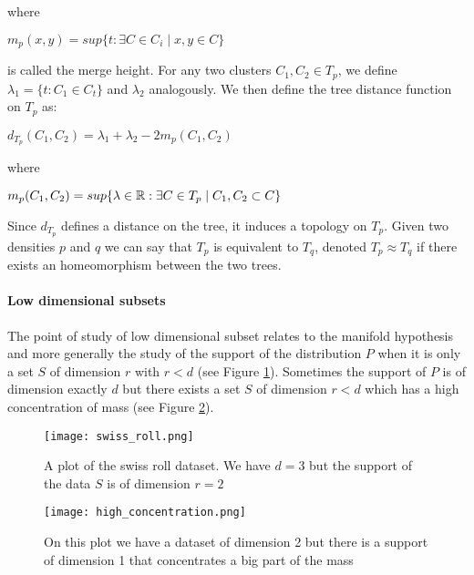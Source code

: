 \documentclass[12pt, a4paper]{article}
\begin{document}
  where

  \begin{center}
    $m_p(x,y) = sup \lbrace t : \exists C\in C_i \mid x,y \in C \rbrace$    
  \end{center}
  
  is called the merge height. For any two clusters $C_1, C_2 \in T_p$, we define $\lambda_1 = \lbrace t: C_1 \in C_t \rbrace$ and $\lambda_2$ analogously. We then define the tree distance function on $T_p$ as:

  \begin{center}
    $d_{T_p}(C_1,C_2) = \lambda_1 + \lambda_2 - 2m_p(C_1,C_2)$
  \end{center}

  where

  \begin{center}
    $m_p(C_1,C_2) = sup \lbrace \lambda \in \mathbb{R} : \exists C \in T_p \mid C_1, C_2 \subset C \rbrace$
  \end{center}

  Since $d_{T_p}$ defines a distance on the tree, it induces a topology on $T_p$. Given two densities $p$ and $q$ we can say that $T_p$ is equivalent to $T_q$, denoted $T_p \approx T_q$ if there exists an homeomorphism between the two trees.

\paragraph{Low dimensional subsets}

The point of study of low dimensional subset relates to the manifold hypothesis and more generally the study of the support of the distribution $P$ when it is only a set $S$ of dimension $r$ with $r < d$ (see Figure \ref{fig:swiss_roll}). Sometimes the support of $P$ is of dimension exactly $d$ but there exists a set $S$ of dimension $r < d$ which has a high concentration of mass (see Figure \ref{fig:high_concentration}).\\  

  \begin{figure}[p]
    \centering
  \texttt{[image: swiss\_roll.png]}
  \caption{A plot of the swiss roll dataset. We have $d=3$ but the support of the data $S$ is of dimension $r=2$}
  \label{fig:swiss_roll}
\end{figure}
  
\begin{figure}[p]
  \centering
  \texttt{[image: high\_concentration.png]}
  \caption{On this plot we have a dataset of dimension 2 but there is a support of dimension 1 that concentrates a big part of the mass}
  \label{fig:high_concentration}
\end{figure}
\end{document}
